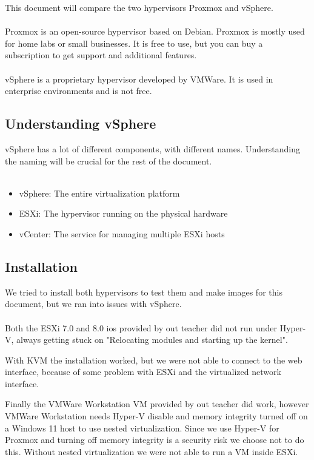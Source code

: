 This document will compare the two hypervisors Proxmox and vSphere.
\\\\
Proxmox is an open-source hypervisor based on Debian. Proxmox is mostly used for home labs or small businesses. It is free to use, but you can buy a subscription to get support and additional features.
\\\\
vSphere is a proprietary hypervisor developed by VMWare. It is used in enterprise environments and is not free.

\subsection{Understanding vSphere}

vSphere has a lot of different components, with different names. Understanding the naming will be crucial for the rest of the document.
\\\\
\begin{itemize}
	\item vSphere: The entire virtualization platform
	\item ESXi: The hypervisor running on the physical hardware
	\item vCenter: The service for managing multiple ESXi hosts
\end{itemize}

\subsection{Installation}

We tried to install both hypervisors to test them and make images for this document, but we ran into issues with vSphere.
\\\\
Both the ESXi 7.0 and 8.0 ios provided by out teacher did not run under Hyper-V, always getting stuck on "Relocating modules and starting up the kernel".

With KVM the installation worked, but we were not able to connect to the web interface, because of some problem with ESXi and the virtualized network interface.

Finally the VMWare Workstation VM provided by out teacher did work, however VMWare Workstation needs Hyper-V disable and memory integrity turned off on a Windows 11 host to use nested virtualization. Since we use Hyper-V for Proxmox and turning off memory integrity is a security risk we choose not to do this. Without nested virtualization we were not able to run a VM inside ESXi.